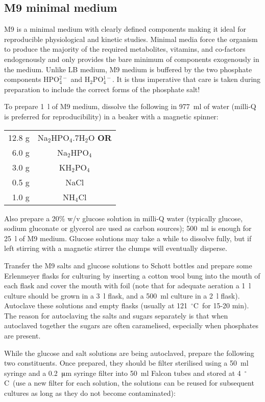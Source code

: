 \documentclass[a4paper]{article}
\newcommand{\dc}{~$^{\circ}$C}
\newcommand{\micro}{$\muup$}
\begin{document}
\begin{multicols}{2}
\subsection{M9 minimal medium}

M9 is a minimal medium with clearly defined components making it ideal for
reproducible physiological and kinetic studies. Minimal media force the
organism to produce the majority of the required metabolites, vitamins,
and co-factors endogenously and only provides the bare minimum of components
exogenously in the medium. Unlike LB medium, M9 medium is buffered by the two
phosphate components HPO$_4^{2-}$ and H$_2$PO$_4^{1-}$. It is thus imperative
that care is taken during preparation to include the correct forms of the
phosphate salt!

To prepare 1~l of M9 medium, dissolve the following in 977~ml of water (milli-Q is
preferred for reproducibility) in a beaker with a magnetic spinner:

\begin{center}
\begin{tabular}[h]{rc} \toprule
12.8 g  & Na$_2$HPO$_4$.7H$_2$O \textbf{OR}\\
6.0 g  & Na$_2$HPO$_4$\\\midrule
3.0 g  & KH$_2$PO$_4$\\
0.5 g   & NaCl\\
1.0 g   & NH$_4$Cl\\ \bottomrule
\end{tabular}
\end{center}

Also prepare a 20\% w/v glucose solution in milli-Q water (typically glucose,
sodium gluconate or glycerol are used as carbon sources); 500~ml is enough for
25~l of M9 medium.  Glucose solutions may take a while to dissolve fully, but
if left stirring with a magnetic stirrer the clumps will eventually disperse.

Transfer the M9 salts and glucose solutions to Schott bottles and prepare some
Erlenmeyer flasks for culturing by inserting a cotton wool bung into the mouth
of each flask and cover the mouth with foil (note that for adequate aeration a
1~l culture should be grown in a 3~l flask, and a 500~ml culture in a 2~l
flask). Autoclave these solutions and empty flasks (usually at 121\dc\ for
15-20 min).  The reason for autoclaving the salts and sugars separately is that
when autoclaved together the sugars are often caramelised, especially when
phosphates are present.

While the glucose and salt solutions are being autoclaved, prepare the
following two constituents. Once prepared, they should be filter sterilised
using a 50~ml syringe and a 0.2~\micro m syringe filter into 50~ml
Falcon tubes and stored at 4\dc\ (use a new filter for each solution, the
solutions can be reused for subsequent cultures as long as they do not become
contaminated):


\end{multicols}
\end{document}

